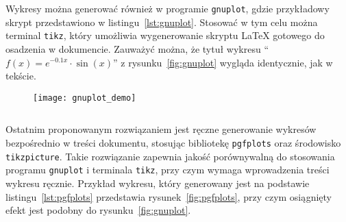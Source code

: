 Wykresy można generować również w programie \texttt{gnuplot}, gdzie przykładowy skrypt przedstawiono w listingu~\ref{lst:gnuplot}. Stosować w tym celu można terminal \texttt{tikz}, który umożliwia wygenerowanie skryptu \LaTeX{} gotowego do osadzenia w dokumencie. Zauważyć można, że tytuł wykresu \enquote{$f(x) = e^{-0.1x} \cdot \sin(x)$} z rysunku~\ref{fig:gnuplot} wygląda identycznie, jak w tekście.

\begin{figure}[htb!]
\centering
\texttt{[image: gnuplot\_demo]}
\end{figure}

\begin{listing}[hbt!]
\inputminted[linenos, breaklines]{gnuplot}{skrypty/plot_demo.gnuplot}
\end{listing}

Ostatnim proponowanym rozwiązaniem jest ręczne generowanie wykresów bezpośrednio w treści dokumentu, stosując bibliotekę \texttt{pgfplots} oraz środowisko \texttt{tikzpicture}. Takie rozwiązanie zapewnia jakość porównywalną do stosowania programu \texttt{gnuplot} i terminala \texttt{tikz}, przy czym wymaga wprowadzenia treści wykresu ręcznie. Przykład wykresu, który generowany jest na podstawie listingu~\ref{lst:pgfplots} przedstawia rysunek~\ref{fig:pgfplots}, przy czym osiągnięty efekt jest podobny do rysunku~\ref{fig:gnuplot}.

\begin{figure}[htb!]
\centering
{}
\end{figure}

